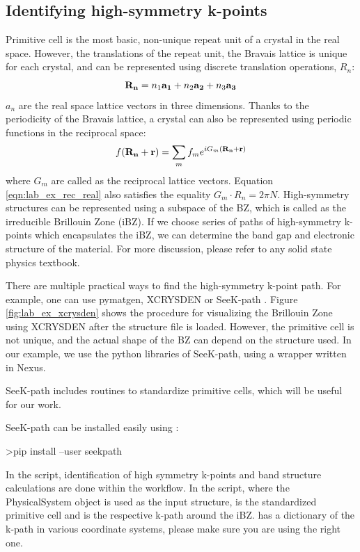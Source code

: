 \subsection{Identifying high-symmetry k-points}\label{sec:lab_ex_highk}
Primitive cell is the most basic, non-unique repeat unit of a crystal in the real space. 
However, the translations of the repeat unit, the Bravais lattice is unique for each crystal, and can be represented using discrete translation operations, $R_n$:
\begin{equation}
{\bf R_n} = n_1{\bf a_1} + n_2{\bf a_2} + n_3{\bf a_3}
\end{equation}
$a_n$ are the real space lattice vectors in three dimensions. Thanks to the periodicity of the Bravais lattice, a crystal can also be represented using periodic functions in the reciprocal space:
\begin{equation}
f({\bf R_n + r})= \sum_{m}f_me^{iG_m({\bf R_n+r})}\label{eqn:lab_ex_rec_real}
\end{equation}
where $G_m$ are called as the reciprocal lattice vectors. Equation \ref{eqn:lab_ex_rec_real} also satisfies the equality $G_m\cdot{R_n}=2{\pi}N$. High-symmetry structures can be represented using a subspace of the BZ, which is called as the irreducible Brillouin Zone (iBZ). If we choose series of  paths of high-symmetry k-points which encapsulates the iBZ, we can determine the band gap and electronic structure of the material. For more discussion, please refer to any solid state physics textbook. 

There are multiple practical ways to find the high-symmetry k-point path. 
For example, one can use pymatgen, \cite{Ong2013} XCRYSDEN \cite{Kokalj1999} or SeeK-path \cite{Hinuma2017}. 
Figure \ref{fig:lab_ex_xcrysden} shows the procedure for visualizing the Brillouin Zone using XCRYSDEN after the structure file is loaded. 
However, the primitive cell is not unique, and the actual shape of the BZ can depend on the structure used. 
In our example, we use the python libraries of SeeK-path, using a wrapper written in Nexus. 

SeeK-path includes routines to standardize primitive cells, which will be useful for our work.

SeeK-path can be installed easily using :
\begin{shade}
>pip install --user seekpath
\end{shade}
 
In the  script, identification of high symmetry k-points and band structure calculations are done within the workflow. 
In the script, where the  PhysicalSystem object is used as the input structure,  is the standardized primitive cell and  is the respective k-path around the iBZ. 
 has a dictionary of the k-path in various coordinate systems, please make sure you are using the right one. 

